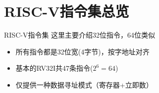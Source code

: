 \documentclass{myslide}
\begin{document}
\section{RISC-V指令集总览}
\begin{frame}
\sectionpage
\end{frame}

\begin{frame}{RISC-V指令集}
这里主要介绍32位指令，64位类似
\begin{itemize}
	\item 所有指令都是32位宽(4字节)，按字地址对齐
	\item 基本的RV32I共47条指令($2^6=64$)
	\item 仅提供一种数据寻址模式（寄存器+立即数）
\end{itemize}
\end{frame}
\end{document}

